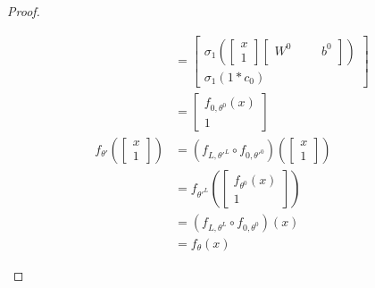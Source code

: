 \documentclass[a4paper]{article}
\theoremstyle{definition}
\begin{document}
\begin{proof}
\begin{enumerate}
\begin{align}
            &=\begin{bmatrix}
                \sigma_1(\begin{bmatrix}     x\\     1 \end{bmatrix}\begin{bmatrix}
                    W^0 & & & b^0\\
                \end{bmatrix})\\
                \sigma_1(1*c_0)
            \end{bmatrix}\\
            &=\begin{bmatrix}
                f_{0,\theta^0}(x)\\
                1
            \end{bmatrix}\\
            f_{\theta'}(\begin{bmatrix}     x\\     1 \end{bmatrix}) &=(f_{L,\theta'^L} \circ f_{0,\theta'^0}) (\begin{bmatrix}     x\\     1 \end{bmatrix})\\
            &= f_{\theta'^L}(\begin{bmatrix}
                f_{\theta^0}(x)\\
                1
            \end{bmatrix})\\
            &= (f_{L,\theta^L} \circ f_{0,\theta^0})(x)\\
            &= f_{\theta}(x)
        \end{align}
    \end{enumerate}
\end{proof}




\end{document}
